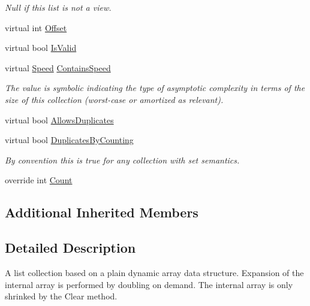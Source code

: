 \begin{DoxyCompactItemize}
\begin{DoxyCompactList}\small\item\em Null if this list is not a view. \end{DoxyCompactList}\item 
virtual int \hyperlink{class_c5_1_1_array_list_ae811cb2c92d313a6d4d54f31dd0caed5}{Offset}
\item 
virtual bool \hyperlink{class_c5_1_1_array_list_a81012dc5309f8f7e24bf61b8eda60b45}{Is\+Valid}
\item 
virtual \hyperlink{namespace_c5_a615ba88dcdaa8d5a3c5f833a73d7fad6}{Speed} \hyperlink{class_c5_1_1_array_list_a4ecabee5bf4516170750cf2bdf1384f0}{Contains\+Speed}
\begin{DoxyCompactList}\small\item\em The value is symbolic indicating the type of asymptotic complexity in terms of the size of this collection (worst-\/case or amortized as relevant). \end{DoxyCompactList}\item 
virtual bool \hyperlink{class_c5_1_1_array_list_a543195d51a2e01b58772297e079f3a17}{Allows\+Duplicates}
\item 
virtual bool \hyperlink{class_c5_1_1_array_list_a7aabcc197b80abbccc4b39497816ec4f}{Duplicates\+By\+Counting}
\begin{DoxyCompactList}\small\item\em By convention this is true for any collection with set semantics. \end{DoxyCompactList}\item 
override int \hyperlink{class_c5_1_1_array_list_aee0f5d70dbc5ce43dfe5ca71f17e5913}{Count}
\end{DoxyCompactItemize}
\subsection*{Additional Inherited Members}


\subsection{Detailed Description}
A list collection based on a plain dynamic array data structure. Expansion of the internal array is performed by doubling on demand. The internal array is only shrinked by the Clear method. 

